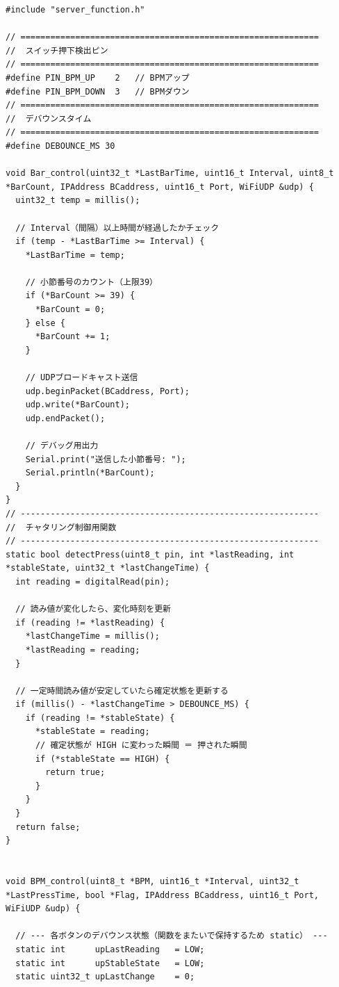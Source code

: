 \begin{lstlisting}
#include "server_function.h"

// ============================================================
//  スイッチ押下検出ピン
// ============================================================
#define PIN_BPM_UP    2   // BPMアップ
#define PIN_BPM_DOWN  3   // BPMダウン
// ============================================================
//  デバウンスタイム
// ============================================================
#define DEBOUNCE_MS 30

void Bar_control(uint32_t *LastBarTime, uint16_t Interval, uint8_t *BarCount, IPAddress BCaddress, uint16_t Port, WiFiUDP &udp) {
  uint32_t temp = millis();
  
  // Interval（間隔）以上時間が経過したかチェック
  if (temp - *LastBarTime >= Interval) {
    *LastBarTime = temp;
    
    // 小節番号のカウント（上限39）
    if (*BarCount >= 39) {
      *BarCount = 0;
    } else {
      *BarCount += 1;
    }
    
    // UDPブロードキャスト送信
    udp.beginPacket(BCaddress, Port);
    udp.write(*BarCount);
    udp.endPacket();

    // デバッグ用出力
    Serial.print("送信した小節番号: ");
    Serial.println(*BarCount);
  }
}
// ------------------------------------------------------------
//  チャタリング制御用関数
// ------------------------------------------------------------
static bool detectPress(uint8_t pin, int *lastReading, int *stableState, uint32_t *lastChangeTime) {
  int reading = digitalRead(pin);

  // 読み値が変化したら、変化時刻を更新
  if (reading != *lastReading) {
    *lastChangeTime = millis();
    *lastReading = reading;
  }

  // 一定時間読み値が安定していたら確定状態を更新する
  if (millis() - *lastChangeTime > DEBOUNCE_MS) {
    if (reading != *stableState) {
      *stableState = reading;
      // 確定状態が HIGH に変わった瞬間 ＝ 押された瞬間
      if (*stableState == HIGH) {
        return true;
      }
    }
  }
  return false;
}


void BPM_control(uint8_t *BPM, uint16_t *Interval, uint32_t *LastPressTime, bool *Flag, IPAddress BCaddress, uint16_t Port, WiFiUDP &udp) {

  // --- 各ボタンのデバウンス状態（関数をまたいで保持するため static） ---
  static int      upLastReading   = LOW;
  static int      upStableState   = LOW;
  static uint32_t upLastChange    = 0;


\end{lstlisting}
